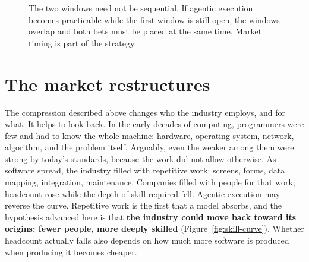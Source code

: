 \documentclass[10pt,oneside,openany]{book}
\begin{document}
\begin{figure}[!htbp]
{}
\caption{The two windows need not be sequential. If agentic execution becomes practicable while the first window is still open, the windows overlap and both bets must be placed at the same time. Market timing is part of the strategy.}
\label{fig:parallel-windows}
\end{figure}

\FloatBarrier
\section{The market restructures}\label{sec:market}

The compression described above changes who the industry employs, and for what. It helps to look back. In the early decades of computing, programmers were few and had to know the whole machine: hardware, operating system, network, algorithm, and the problem itself. Arguably, even the weaker among them were strong by today's standards, because the work did not allow otherwise. As software spread, the industry filled with repetitive work: screens, forms, data mapping, integration, maintenance. Companies filled with people for that work; headcount rose while the depth of skill required fell. Agentic execution may reverse the curve. Repetitive work is the first that a model absorbs, and the hypothesis advanced here is that \textbf{the industry could move back toward its origins: fewer people, more deeply skilled} (Figure~\ref{fig:skill-curve}). Whether headcount actually falls also depends on how much more software is produced when producing it becomes cheaper.
\end{document}
